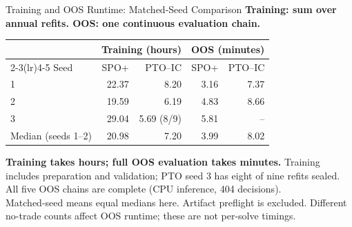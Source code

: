 \documentclass[aspectratio=169,xcolor=dvipsnames]{beamer}
\begin{document}
\begin{frame}{Training and OOS Runtime: Matched-Seed Comparison}
    \small
    \textbf{Training: sum over annual refits. OOS: one continuous evaluation chain.}
    \vspace{6pt}
    \begin{table}
    \centering\small\setlength{\tabcolsep}{9pt}
    \begin{tabular}{l r r r r}
    \toprule
    & \multicolumn{2}{c}{Training (hours)} & \multicolumn{2}{c}{OOS (minutes)} \\
    \cmidrule(lr){2-3}\cmidrule(lr){4-5}
    Seed & SPO+ & PTO--IC & SPO+ & PTO--IC \\
    \midrule
1 & 22.37 & 8.20 & 3.16 & 7.37 \\
2 & 19.59 & 6.19 & 4.83 & 8.66 \\
3 & 29.04 & 5.69 (8/9) & 5.81 & -- \\
\midrule
Median (seeds 1--2) & 20.98 & 7.20 & 3.99 & 8.02 \\
    \bottomrule
    \end{tabular}
    \end{table}
    \vspace{6pt}
    \textbf{Training takes hours; full OOS evaluation takes minutes.}
    \vspace{2pt}
    \scriptsize
    Training includes preparation and validation; PTO seed 3 has eight of nine
    refits sealed. All five OOS chains are complete (CPU inference, 404 decisions).\\[3pt]
    Matched-seed means equal medians here. Artifact preflight is excluded.
    Different no-trade counts affect OOS runtime; these are not per-solve timings.
\end{frame}
\end{document}
